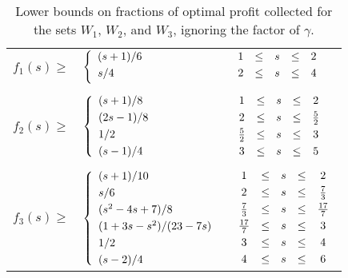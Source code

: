 \documentclass[11pt]{article}
\begin{document}
\begin{table}[!hbt]
\begin{center}
\begin{tabular}{rll}
$f_1(s) \geq$ & 
$\left\{ \begin{array}{l}
(s+1)/6 \smallskip \\ 
s/4 \smallskip \\ 
\end{array} \right.$ &
$\begin{array}{crclc}
1& \leq &s& \leq &2 \smallskip \\ 
2& \leq &s& \leq &4 \smallskip \\
\end{array}$
\\ \\
$f_2(s) \geq$ &
$\left\{ \begin{array}{l}
(s+1)/8 \smallskip \\
(2s-1)/8 \smallskip \\
1/2 \smallskip \\
(s-1)/4
\end{array} \right.$ &
$\begin{array}{crclc}
1& \leq &s&  \leq &2 \smallskip \\
2& \leq &s&  \leq &{5 \over 2} \smallskip \\
{5 \over 2}& \leq &s&  \leq &3 \smallskip \\
3& \leq &s& \leq &5
\end{array}$
\\ \\
$f_3(s) \geq$ &
$\left\{ \begin{array}{l}
(s+1)/10 \smallskip \\
s/6 \smallskip \\
(s^2 - 4s + 7)/8 \smallskip \\
(1 + 3s - s^2)/(23- 7s) \smallskip \\
1/2 \smallskip \\
(s-2)/4
\end{array} \right.$ &
$\begin{array}{crclc}
1& \leq &s&  \leq &2 \smallskip \\
2& \leq &s&  \leq &{7 \over 3} \smallskip \\
{7 \over 3}& \leq &s&  \leq &{17 \over 7} \smallskip \\
{17 \over 7}& \leq &s&  \leq &3 \smallskip \\
3& \leq &s& \leq &4 \smallskip \\
4& \leq &s& \leq &6
\end{array}$
\end{tabular}\\
\caption{Lower bounds on fractions of optimal profit collected for the sets $W_1$, $W_2$, and $W_3$, ignoring the factor of $\gamma$.}
\label{table:Wratios}
\end{center}
\end{table}
\end{document}
